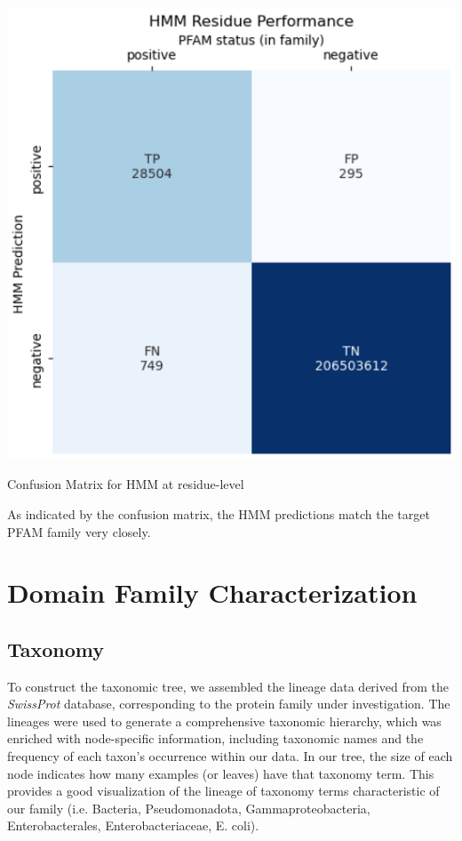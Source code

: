 \documentclass[10pt,twocolumn,letterpaper]{article}
\begin{document}
\begin{center}
    \includegraphics[scale=0.45]{report/img/hmm_res_performance.png}
\end{center}

\begin{center}
    \small{Confusion Matrix for HMM at residue-level}
\end{center}

As indicated by the confusion matrix, the HMM predictions match the target PFAM family very closely.

\section{Domain Family Characterization}

\subsection{Taxonomy}

To construct the taxonomic tree, we assembled the lineage data derived from the \textit{SwissProt} database, corresponding to the protein family under investigation. The lineages were used to generate a comprehensive taxonomic hierarchy, which was enriched with node-specific information, including taxonomic names and the frequency of each taxon's occurrence within our data. In our tree, the size of each node indicates how many examples (or leaves) have that taxonomy term. This provides a good visualization of the lineage of taxonomy terms characteristic of our family (i.e. Bacteria, Pseudomonadota, Gammaproteobacteria, Enterobacterales, Enterobacteriaceae, E. coli).
\end{document}
